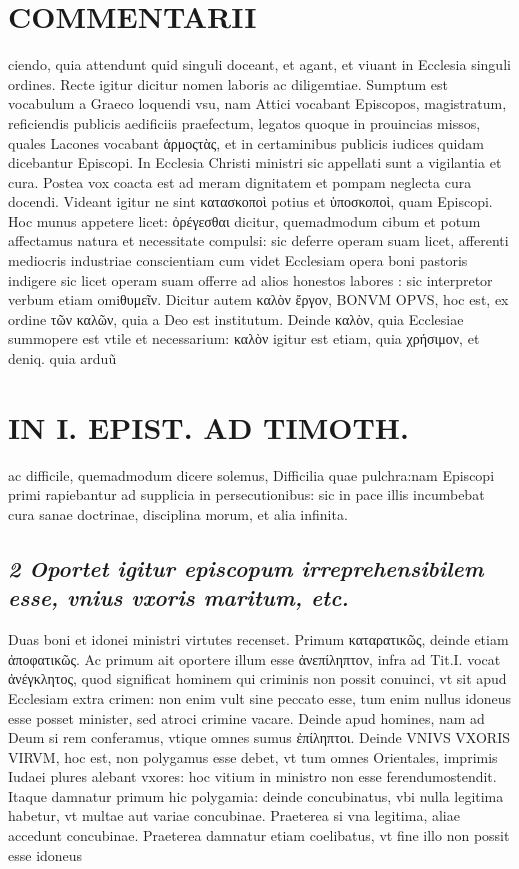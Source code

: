 \documentclass{article}
\begin{document}
\begin{pages}
\section*{COMMENTARII }
\marginpar{[ p.62 ]}\pstart ciendo, quia attendunt quid singuli doceant, et agant, et viuant in Ecclesia singuli ordines. Recte igitur dicitur nomen laboris ac diligemtiae. Sumptum est vocabulum a Graeco loquendi vsu, nam Attici vocabant Episcopos, magistratum, reficiendis publicis aedificiis praefectum, legatos quoque in prouincias missos, quales Lacones vocabant ἁρμοςτὰς, et in certaminibus publicis iudices quidam dicebantur Episcopi. In Ecclesia Christi ministri sic appellati sunt a vigilantia et cura. Postea vox coacta est ad meram dignitatem et pompam neglecta cura docendi. Videant igitur ne sint κατασκοποὶ potius et ὑποσκοποὶ, quam Episcopi.  \pend\pstart Hoc munus appetere licet: ὀρέγεσθαι dicitur, quemadmodum cibum et potum affectamus natura et necessitate compulsi: sic deferre operam suam licet, afferenti mediocris industriae conscientiam cum videt Ecclesiam opera boni pastoris indigere sic licet operam suam offerre ad alios honestos labores : sic interpretor verbum etiam omiθυμεῖν.  \pend\pstart Dicitur autem καλὸν ἔργον, BONVM OPVS, hoc est, ex ordine τῶν καλῶν, quia a Deo est institutum. Deinde καλὸν, quia Ecclesiae summopere est vtile et necessarium: καλὸν igitur est etiam, quia χρήσιμον, et deniq. quia arduũ  \pend
\section*{IN I. EPIST. AD TIMOTH. }
\marginpar{[ p.63 ]}\pstart ac difficile, quemadmodum dicere solemus, Difficilia quae pulchra:nam Episcopi primi rapiebantur ad supplicia in persecutionibus: sic in pace illis incumbebat cura sanae doctrinae, disciplina morum, et alia infinita.  \pend
{}
{}
\subsection*{\textit{2 Oportet igitur episcopum irreprehensibilem esse, vnius vxoris maritum, etc. }}\pstart Duas boni et idonei ministri virtutes recenset. Primum καταρατικῶς, deinde etiam ἀποφατικῶς. Ac primum ait oportere illum esse ἀνεπίληπτον, infra ad Tit.I. vocat ἀνέγκλητος, quod significat hominem qui criminis non possit conuinci, vt sit apud Ecclesiam extra crimen: non enim vult sine peccato esse, tum enim nullus idoneus esse posset minister, sed atroci crimine vacare. Deinde apud homines, nam ad Deum si rem conferamus, vtique omnes sumus ἐπίληπτοι. Deinde VNIVS VXORIS VIRVM, hoc est, non polygamus esse debet, vt tum omnes Orientales, imprimis Iudaei plures alebant vxores: hoc vitium in ministro non esse ferendumostendit. Itaque damnatur primum hic polygamia: deinde concubinatus, vbi nulla legitima habetur, vt multae aut variae concubinae. Praeterea si vna legitima, aliae accedunt concubinae. Praeterea damnatur etiam coelibatus, vt fine illo non possit esse idoneus  \pend

\end{pages}
\end{document}
